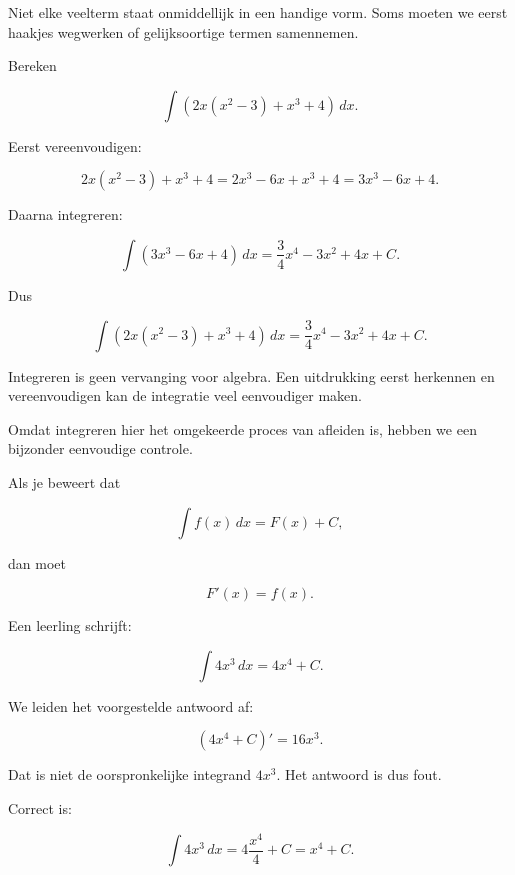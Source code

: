 \documentclass{ximera}
\begin{document}


Niet elke veelterm staat onmiddellijk in een handige vorm. Soms moeten
we eerst haakjes wegwerken of gelijksoortige termen samennemen.

\begin{voorbeeld}
Bereken

\[
\int\left(2x(x^2-3)+x^3+4\right)\,dx.
\]

Eerst vereenvoudigen:

\[
2x(x^2-3)+x^3+4
=
2x^3-6x+x^3+4
=
3x^3-6x+4.
\]

Daarna integreren:

\[
\int(3x^3-6x+4)\,dx
=
\frac34x^4-3x^2+4x+C.
\]

Dus

\[
\boxed{
\int\left(2x(x^2-3)+x^3+4\right)\,dx
=
\frac34x^4-3x^2+4x+C.
}
\]
\end{voorbeeld}

\begin{opmerking}
Integreren is geen vervanging voor algebra. Een uitdrukking eerst
herkennen en vereenvoudigen kan de integratie veel eenvoudiger maken.
\end{opmerking}



Omdat integreren hier het omgekeerde proces van afleiden is, hebben we
een bijzonder eenvoudige controle.

Als je beweert dat

\[
\int f(x)\,dx=F(x)+C,
\]

dan moet

\[
F'(x)=f(x).
\]

\begin{voorbeeld}

Een leerling schrijft:

\[
\int 4x^3\,dx=4x^4+C.
\]

We leiden het voorgestelde antwoord af:

\[
(4x^4+C)'=16x^3.
\]

Dat is niet de oorspronkelijke integrand \(4x^3\). Het antwoord is dus
fout.

Correct is:

\[
\int4x^3\,dx
=
4\frac{x^4}{4}+C
=
x^4+C.
\]
\end{voorbeeld}
\end{document}

